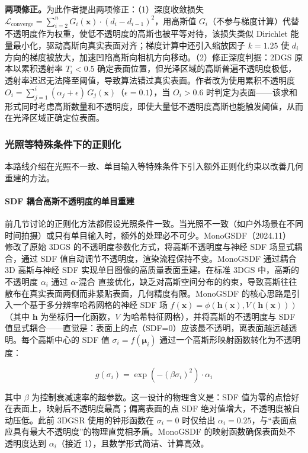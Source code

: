 \textbf{两项修正。}为此作者提出两项修正：（1）深度收敛损失 $\mathcal{L}_{\mathrm{converge}} = \sum_{i=2}^{n} G_i(\mathbf{x}) \cdot (d_i - d_{i-1})^2$，用高斯值 $G_i$（不参与梯度计算）代替不透明度作为权重，使低不透明度的高斯也被平等对待，该损失类似 Dirichlet 能量最小化，驱动高斯向真实表面对齐；梯度计算中还引入缩放因子 $k=1.25$ 使 $d_i$ 方向的梯度被放大，加速凹陷高斯向相机方向移动。（2）修正深度判据：2DGS 原本以累积透射率 $T_i < 0.5$ 确定表面位置，但光泽区域的高斯普遍不透明度极低，透射率迟迟无法降至阈值，导致算法错过真实表面。作者改为使用累积不透明度 $O_i = \sum_{j=1}^{i}(\alpha_j + \epsilon)\, G_j(\mathbf{x})$（$\epsilon=0.1$），当 $O_i > 0.6$ 时判定为表面——该求和形式同时考虑高斯数量和不透明度，即使大量低不透明度高斯也能触发阈值，从而在光泽区域正确定位表面。

\subsubsection{光照等特殊条件下的正则化}
\label{subsec:04_1_6}

本路线介绍在光照不一致、单目输入等特殊条件下引入额外正则化约束以改善几何重建的方法。

\paragraph{SDF 耦合高斯不透明度的单目重建}

前几节讨论的正则化方法都假设光照条件一致。当光照不一致（如户外场景在不同时间拍摄）或只有单目输入时，额外的处理必不可少。MonoGSDF（2024.11）~\cite{2411_16898} 修改了原始 3DGS 的不透明度参数化方式，将高斯不透明度与神经 SDF 场显式耦合，通过 SDF 值自动调节不透明度，渲染流程保持不变。MonoGSDF 通过耦合 3D 高斯与神经 SDF 实现单目图像的高质量表面重建。在标准 3DGS 中，高斯的不透明度 $\alpha_i$ 通过 $\alpha$-混合 直接优化，缺乏对高斯空间分布的约束，导致高斯往往散布在真实表面两侧而非紧贴表面，几何精度有限。MonoGSDF 的核心思路是引入一个基于多分辨率哈希网格的神经 SDF 场 $f(\mathbf{x}) = \phi(\mathbf{h}(\mathbf{x}), V(\mathbf{h}(\mathbf{x})))$（其中 $\mathbf{h}$ 为坐标归一化函数，$V$ 为哈希特征网格），并将高斯的不透明度与 SDF 值显式耦合——直觉是：表面上的点（SDF=0）应该最不透明，离表面越远越透明。每个高斯中心的 SDF 值 $\sigma_i = f(\boldsymbol{\mu}_i)$ 通过一个高斯形映射函数转化为不透明度：

\begin{equation}
g(\sigma_i) = \exp(-(\beta \sigma_i)^2) \cdot \alpha_i
\end{equation}

其中 $\beta$ 为控制衰减速率的超参数。这一设计的物理含义是：SDF 值为零的点恰好在表面上，映射后不透明度最高；偏离表面的点 SDF 绝对值增大，不透明度被自动压低。此前 3DGSR 使用的钟形函数在 $\sigma_i=0$ 时仅给出 $\alpha_i=0.25$，与“表面点应具有最大不透明度”的物理直觉相矛盾。MonoGSDF 的映射函数确保表面处不透明度达到 $\alpha_i$（接近 1），且数学形式简洁、计算高效。

